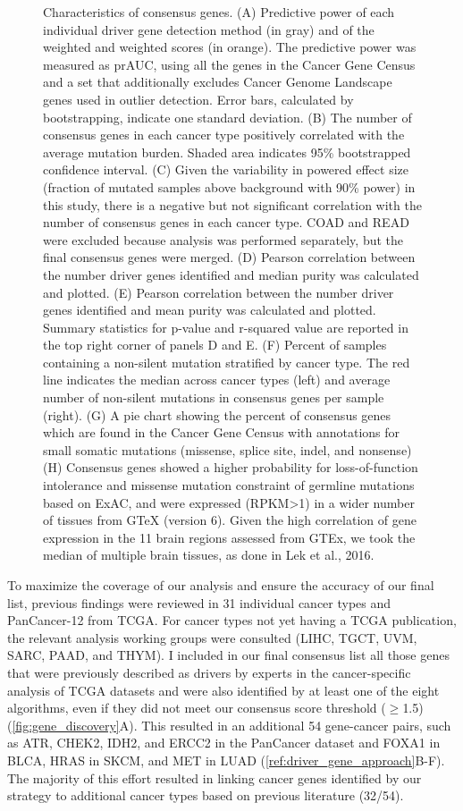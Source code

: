 \begin{figure}
  \caption[Characteristics of consensus genes.]{Characteristics of consensus genes. (A) Predictive power of each individual driver gene detection method (in gray) and of the weighted and weighted scores (in orange). The predictive power was measured as prAUC, using all the genes in the Cancer Gene Census and a set that additionally excludes Cancer Genome Landscape genes used in outlier detection. Error bars, calculated by bootstrapping, indicate one standard deviation. (B) The number of consensus genes in each cancer type positively correlated with the average mutation burden. Shaded area indicates 95\% bootstrapped confidence interval. (C) Given the variability in powered effect size (fraction of mutated samples above background with 90\% power) in this study, there is a negative but not significant correlation with the number of consensus genes in each cancer type. COAD and READ were excluded because analysis was performed separately, but the final consensus genes were merged. (D) Pearson correlation between the number driver genes identified and median purity was calculated and plotted. (E) Pearson correlation between the number driver genes identified and mean purity was calculated and plotted. Summary statistics for p-value and r-squared value are reported in the top right corner of panels D and E. (F) Percent of samples containing a non-silent mutation stratified by cancer type. The red line indicates the median across cancer types (left) and average number of non-silent mutations in consensus genes per sample (right). (G) A pie chart showing the percent of consensus genes which are found in the Cancer Gene Census with annotations for small somatic mutations (missense, splice site, indel, and nonsense) (H) Consensus genes showed a higher probability for loss-of-function intolerance and missense mutation constraint of germline mutations based on ExAC, and were expressed (RPKM>1) in a wider number of tissues from GTeX (version 6). Given the high correlation of gene expression in the 11 brain regions assessed from GTEx, we took the median of multiple brain tissues, as done in Lek et al., 2016.}
  \label{fig:gene_characteristics}
\end{figure}

To maximize the coverage of our analysis and ensure the accuracy of our final list, previous findings were reviewed in 31 individual cancer types and PanCancer-12 from TCGA. For cancer types not yet having a TCGA publication, the relevant analysis working groups were consulted (LIHC, TGCT, UVM, SARC, PAAD, and THYM). I included in our final consensus list all those genes that were previously described as drivers by experts in the cancer-specific analysis of TCGA datasets and were also identified by at least one of the eight algorithms, even if they did not meet our consensus score threshold ($\geq$1.5)(\autoref{fig:gene_discovery}A). This resulted in an additional 54 gene-cancer pairs, such as ATR, CHEK2, IDH2, and ERCC2 in the PanCancer dataset and FOXA1 in BLCA, HRAS in SKCM, and MET in LUAD (\autoref{ref:driver_gene_approach}B-F). The majority of this effort resulted in linking cancer genes identified by our strategy to additional cancer types based on previous literature (32/54).  

